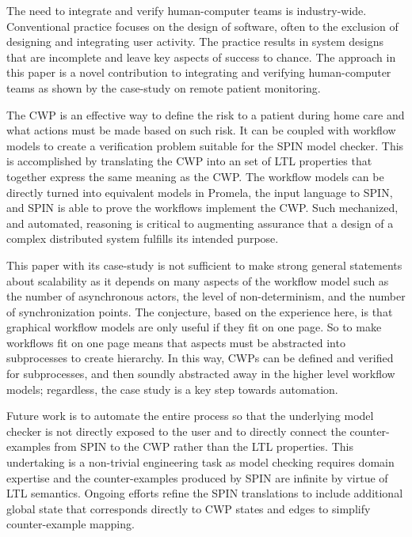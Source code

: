 The need to integrate and verify human-computer teams is industry-wide. Conventional practice focuses on the design of software, often to the exclusion of designing and integrating user activity. The practice results in system designs that are incomplete and leave key aspects of success to chance. The approach in this paper is a novel contribution to integrating and verifying human-computer teams as shown by the case-study on remote patient monitoring. 

The CWP is an effective way to define the risk to a patient during home care and what actions must be made based on such risk. It can be coupled with workflow models to create a verification problem suitable for the SPIN model checker. This is accomplished by translating the CWP into an set of LTL properties that together express the same meaning as the CWP. The workflow models can be directly turned into equivalent models in Promela, the input language to SPIN, and SPIN is able to prove the workflows implement the CWP. Such mechanized, and automated, reasoning is critical to augmenting assurance that a design of a complex distributed system fulfills its intended purpose. 

This paper with its case-study is not sufficient to make strong general statements about scalability as it depends on many aspects of the workflow model such as the number of asynchronous actors, the level of non-determinism, and the number of synchronization points. The conjecture, based on the experience here, is that graphical workflow models are only useful if they fit on one page. So to make workflows fit on one page means that aspects must be abstracted into subprocesses to create hierarchy. In this way, CWPs can be defined and verified for subprocesses, and then soundly abstracted away in the higher level workflow models; regardless, the case study is a key step towards automation. 

Future work is to automate the entire process so that the underlying model checker is not directly exposed to the user and to directly connect the counter-examples from SPIN to the CWP rather than the LTL properties. This undertaking is a non-trivial engineering task as model checking requires domain expertise and the counter-examples produced by SPIN are infinite by virtue of LTL semantics. Ongoing efforts refine the SPIN translations to include additional global state that corresponds directly to CWP states and edges to simplify counter-example mapping.
